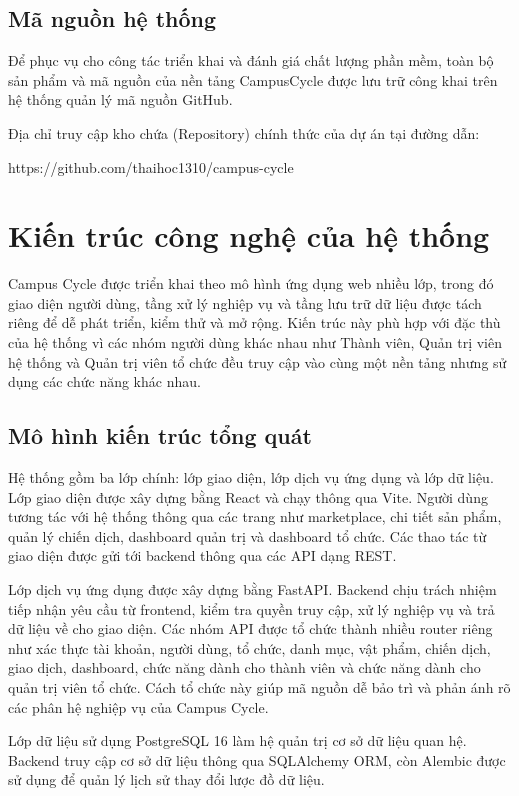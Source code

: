 \documentclass[12pt,a4paper]{report}
\begin{document}
\subsection{Mã nguồn hệ thống}

Để phục vụ cho công tác triển khai và đánh giá chất lượng phần mềm, toàn
bộ sản phẩm và mã nguồn của nền tảng CampusCycle được lưu trữ công khai trên
hệ thống quản lý mã nguồn GitHub.

Địa chỉ truy cập kho chứa (Repository) chính thức của dự án tại đường dẫn:

https://github.com/thaihoc1310/campus-cycle

\section{Kiến trúc công nghệ của hệ thống}

Campus Cycle được triển khai theo mô hình ứng dụng web nhiều lớp, trong đó
giao diện người dùng, tầng xử lý nghiệp vụ và tầng lưu trữ dữ liệu được tách
riêng để dễ phát triển, kiểm thử và mở rộng. Kiến trúc này phù hợp với đặc thù
của hệ thống vì các nhóm người dùng khác nhau như Thành viên, Quản trị viên
hệ thống và Quản trị viên tổ chức đều truy cập vào cùng một nền tảng nhưng sử
dụng các chức năng khác nhau.

\subsection{Mô hình kiến trúc tổng quát}

Hệ thống gồm ba lớp chính: lớp giao diện, lớp dịch vụ ứng dụng và lớp dữ
liệu. Lớp giao diện được xây dựng bằng React và chạy thông qua Vite. Người dùng
tương tác với hệ thống thông qua các trang như marketplace, chi tiết sản phẩm,
quản lý chiến dịch, dashboard quản trị và dashboard tổ chức. Các thao tác từ giao
diện được gửi tới backend thông qua các API dạng REST.

Lớp dịch vụ ứng dụng được xây dựng bằng FastAPI. Backend chịu trách nhiệm
tiếp nhận yêu cầu từ frontend, kiểm tra quyền truy cập, xử lý nghiệp vụ và trả dữ
liệu về cho giao diện. Các nhóm API được tổ chức thành nhiều router riêng như
xác thực tài khoản, người dùng, tổ chức, danh mục, vật phẩm, chiến dịch, giao
dịch, dashboard, chức năng dành cho thành viên và chức năng dành cho quản trị
viên tổ chức. Cách tổ chức này giúp mã nguồn dễ bảo trì và phản ánh rõ các phân
hệ nghiệp vụ của Campus Cycle.

Lớp dữ liệu sử dụng PostgreSQL 16 làm hệ quản trị cơ sở dữ liệu quan hệ.
Backend truy cập cơ sở dữ liệu thông qua SQLAlchemy ORM, còn Alembic được sử
dụng để quản lý lịch sử thay đổi lược đồ dữ liệu.
\end{document}
